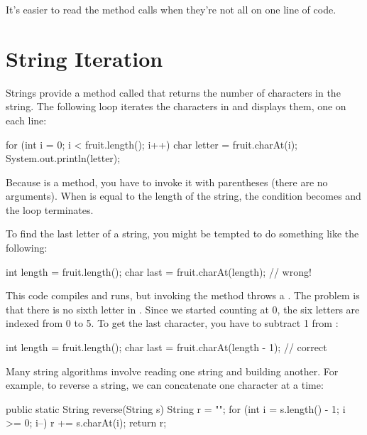 It's easier to read the  method calls when they're not all on one line of code.


\section{String Iteration}


Strings provide a method called  that returns the number of characters in the string.
The following loop iterates the characters in  and displays them, one on each line:

\begin{code}
for (int i = 0; i < fruit.length(); i++) {
    char letter = fruit.charAt(i);
    System.out.println(letter);
}
\end{code}


Because  is a method, you have to invoke it with parentheses (there are no arguments).
When  is equal to the length of the string, the condition becomes  and the loop terminates.

To find the last letter of a string, you might be tempted to do something like the following:

\begin{code}
int length = fruit.length();
char last = fruit.charAt(length);      // wrong!
\end{code}


This code compiles and runs, but invoking the  method throws a .
The problem is that there is no sixth letter in .
Since we started counting at 0, the six letters are indexed from 0 to 5.
To get the last character, you have to subtract 1 from :

\begin{code}
int length = fruit.length();
char last = fruit.charAt(length - 1);  // correct
\end{code}

Many string algorithms involve reading one string and building another.
For example, to reverse a string, we can concatenate one character at a time:

\begin{code}
public static String reverse(String s) {
    String r = "";
    for (int i = s.length() - 1; i >= 0; i--) {
        r += s.charAt(i);
    }
    return r;
}
\end{code}

